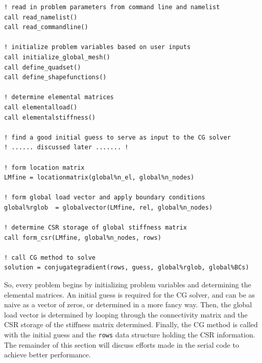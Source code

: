 \documentclass[10pt]{article}
\begin{document}
\begin{lstlisting}
! read in problem parameters from command line and namelist
call read_namelist()
call read_commandline()

! initialize problem variables based on user inputs
call initialize_global_mesh()
call define_quadset()
call define_shapefunctions()

! determine elemental matrices
call elementalload()
call elementalstiffness()

! find a good initial guess to serve as input to the CG solver
! ...... discussed later ....... !

! form location matrix
LMfine = locationmatrix(global%n_el, global%n_nodes)

! form global load vector and apply boundary conditions
global%rglob  = globalvector(LMfine, rel, global%n_nodes)

! determine CSR storage of global stiffness matrix
call form_csr(LMfine, global%n_nodes, rows)

! call CG method to solve
solution = conjugategradient(rows, guess, global%rglob, global%BCs)
\end{lstlisting}

So, every problem begins by initializing problem variables and determining the elemental matrices. An initial guess is required for the CG solver, and can be as naive as a vector of zeros, or determined in a more fancy way. Then, the global load vector is determined by looping through the connectivity matrix and the CSR storage of the stiffness matrix determined. Finally, the CG method is called with the initial guess and the {\tt rows} data structure holding the CSR information. The remainder of this section will discuss efforts made in the serial code to achieve better performance.
\end{document}
